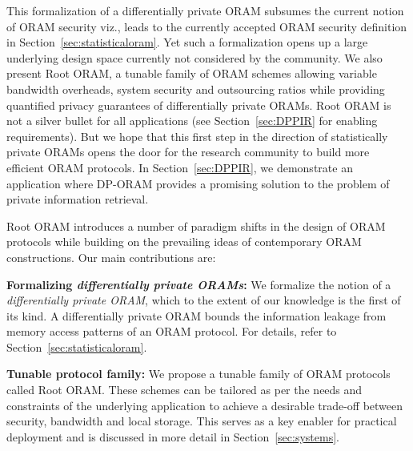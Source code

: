 \documentclass[USenglish,oneside,twocolumn]{article}
\makeatletter
\newcommand{\ourprotocol}{Root ORAM}
\let\origsubsection\subsection
\renewcommand\subsection{\@ifstar{\starsubsection}{\nostarsubsection}}
\newcommand\nostarsubsection[1]
{\subsectionprelude\origsubsection{#1}\subsectionpostlude}
\newcommand\starsubsection[1]
{\subsectionprelude\origsubsection*{#1}\subsectionpostlude}
\newcommand\subsectionprelude{\vspace{-1.5em}}
\newcommand\subsectionpostlude{\vspace{-1em}}
\makeatother
\begin{document}
This formalization of a differentially private ORAM subsumes the current notion of ORAM security viz.,  leads to the currently accepted ORAM security definition in Section~\ref{sec:statisticaloram}. Yet such a formalization opens up a large underlying design space currently not considered by the community. We also present \ourprotocol{}, a tunable family of ORAM schemes allowing variable bandwidth overheads, 
system security and outsourcing ratios while providing quantified privacy guarantees of differentially private ORAMs. \ourprotocol{} is not a silver bullet for all applications (see Section~\ref{sec:DPPIR} for enabling requirements). But we hope that this first step in the direction of statistically private ORAMs opens the door for the research community to build more efficient ORAM protocols. In Section~\ref{sec:DPPIR}, we demonstrate an application where DP-ORAM provides a promising solution to the problem of private information retrieval.


\subsection{Our Contributions}
\ourprotocol{} introduces a number of paradigm shifts in the design of ORAM protocols while 
building on the prevailing ideas of contemporary ORAM constructions. Our main contributions are: 


\textbf{Formalizing \emph{differentially private ORAMs}: }We formalize the notion of a 
\emph{differentially private ORAM}, which to the extent of our knowledge is 
the first of its kind. A differentially private ORAM bounds the information 
leakage from memory access patterns of an ORAM protocol. 
For details, refer to Section~\ref{sec:statisticaloram}.

\textbf{Tunable protocol family: }We propose a tunable family of ORAM protocols called \ourprotocol{}. These schemes can be tailored as per the needs and 
constraints of the underlying application to achieve a desirable trade-off between security, bandwidth and local storage. This serves as a key enabler for practical deployment 
and is discussed in more detail in Section~\ref{sec:systems}.
\end{document}
